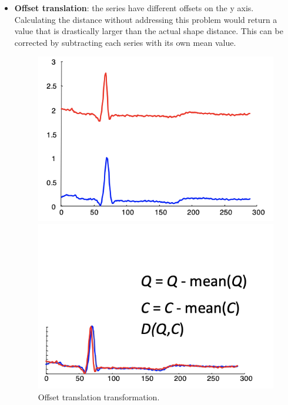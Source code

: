\begin{itemize}
    \item \textbf{Offset translation}: the series have different offsets on the y axis. Calculating the distance without addressing this problem would return a value that is drastically larger than the actual shape distance. This can be corrected by subtracting each series with its own mean value.
    \begin{figure}[ht]
        \centering
        \begin{minipage}{0.40\textwidth}
         \includegraphics[width=1.0\linewidth]{img/offset_trans_1.png}
        \end{minipage}
        \hfill
        \begin{minipage}{0.40\textwidth}
            \includegraphics[width=1.0\linewidth]{img/offset_trans_2.png}
        \end{minipage}
        \label{fig:offset-trans}
        \caption{Offset translation transformation.}
    \end{figure}


\end{itemize}
